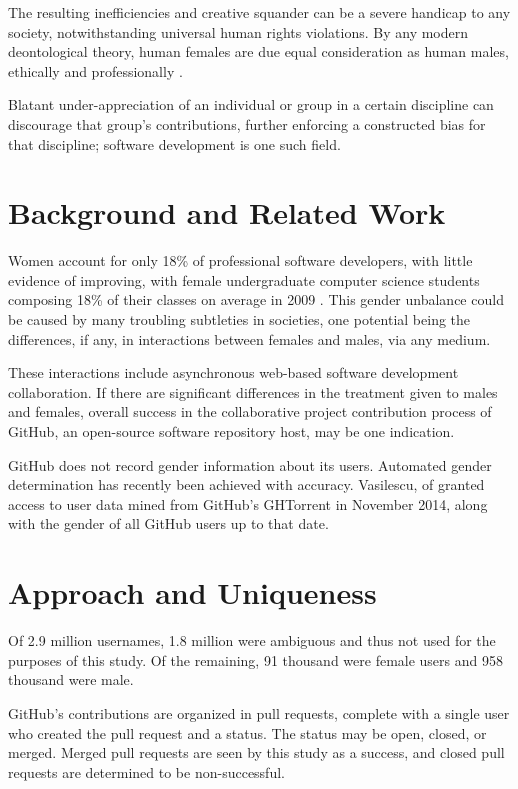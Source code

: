 \documentclass{sigplanconf}
\begin{document}
The resulting inefficiencies and creative
squander can be a severe handicap to any society, notwithstanding universal human rights
violations. By any modern deontological theory, human females are due equal
consideration as human males, ethically and professionally \citep{ethicsgender}.

Blatant under-appreciation of an individual or group in a certain
discipline can discourage that group's contributions, further enforcing a
constructed bias for that discipline; software development is one such
field.

\section{Background and Related Work}

Women account for only 18\% of professional software developers,
\cite{sherdiversity} with little evidence of improving, with female
undergraduate computer science students composing 18\% of
their classes on average in 2009 \cite{womenundergrad}. This gender unbalance could be caused by many troubling subtleties
in societies, one potential being the differences, if any, in interactions
between females and males, via any medium.

These interactions include asynchronous web-based software development
collaboration. If there are significant differences in the treatment given to males
and females, overall success in the collaborative project contribution process
of GitHub, an open-source software repository host, may be one indication.

GitHub does not record gender information about its users. Automated gender
determination has recently been achieved with accuracy. \cite{VasilescuIWC13}
Vasilescu, of \cite{VasilescuIWC13} granted access to user data mined from GitHub's GHTorrent in November 2014,
along with the gender of all GitHub users up to that date.

\section{Approach and Uniqueness}

Of 2.9 million usernames, 1.8 million were ambiguous and thus
not used for the purposes of this study. Of the remaining, 91 thousand were
female users and 958 thousand were male.

GitHub's contributions are organized in pull requests, complete with a single
user who created the pull request and a status. The status may be open, closed,
or merged. Merged pull requests are seen by this study as a success, and closed pull
requests are determined to be non-successful.
\end{document}
